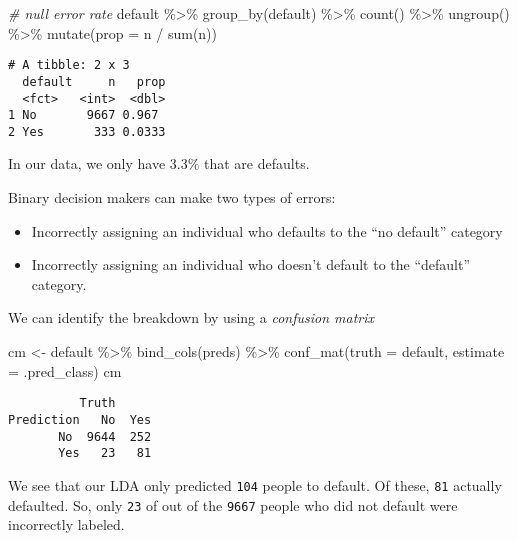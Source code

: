 \documentclass[
]{article}
\newenvironment{Shaded}{\begin{snugshade}}{\end{snugshade}}
\newcommand{\AttributeTok}[1]{\textcolor[rgb]{0.77,0.63,0.00}{#1}}
\newcommand{\CommentTok}[1]{\textcolor[rgb]{0.56,0.35,0.01}{\textit{#1}}}
\newcommand{\FunctionTok}[1]{\textcolor[rgb]{0.00,0.00,0.00}{#1}}
\newcommand{\NormalTok}[1]{#1}
\newcommand{\OtherTok}[1]{\textcolor[rgb]{0.56,0.35,0.01}{#1}}
\newcommand{\SpecialCharTok}[1]{\textcolor[rgb]{0.00,0.00,0.00}{#1}}
\providecommand{\tightlist}{%
  \setlength{\itemsep}{0pt}\setlength{\parskip}{0pt}}
\begin{document}
\begin{Shaded}
\begin{Highlighting}[]
\CommentTok{\# null error rate}
\NormalTok{default }\SpecialCharTok{\%\textgreater{}\%}
  \FunctionTok{group\_by}\NormalTok{(default) }\SpecialCharTok{\%\textgreater{}\%}
  \FunctionTok{count}\NormalTok{() }\SpecialCharTok{\%\textgreater{}\%}
  \FunctionTok{ungroup}\NormalTok{() }\SpecialCharTok{\%\textgreater{}\%}
  \FunctionTok{mutate}\NormalTok{(}\AttributeTok{prop =}\NormalTok{ n }\SpecialCharTok{/} \FunctionTok{sum}\NormalTok{(n))}
\end{Highlighting}
\end{Shaded}

\begin{verbatim}
# A tibble: 2 x 3
  default     n   prop
  <fct>   <int>  <dbl>
1 No       9667 0.967 
2 Yes       333 0.0333
\end{verbatim}

In our data, we only have 3.3\% that are defaults.

Binary decision makers can make two types of errors:

\begin{itemize}
\tightlist
\item
  Incorrectly assigning an individual who defaults to the ``no default''
  category
\item
  Incorrectly assigning an individual who doesn't default to the
  ``default'' category.
\end{itemize}

We can identify the breakdown by using a \emph{confusion matrix}

\begin{Shaded}
\begin{Highlighting}[]
\NormalTok{cm }\OtherTok{\textless{}{-}}\NormalTok{ default }\SpecialCharTok{\%\textgreater{}\%}
  \FunctionTok{bind\_cols}\NormalTok{(preds) }\SpecialCharTok{\%\textgreater{}\%}
  \FunctionTok{conf\_mat}\NormalTok{(}\AttributeTok{truth =}\NormalTok{ default, }\AttributeTok{estimate =}\NormalTok{ .pred\_class)}
\NormalTok{cm}
\end{Highlighting}
\end{Shaded}

\begin{verbatim}
          Truth
Prediction   No  Yes
       No  9644  252
       Yes   23   81
\end{verbatim}

We see that our LDA only predicted \texttt{104} people to default. Of
these, \texttt{81} actually defaulted. So, only \texttt{23} of out of
the \texttt{9667} people who did not default were incorrectly labeled.
\end{document}
